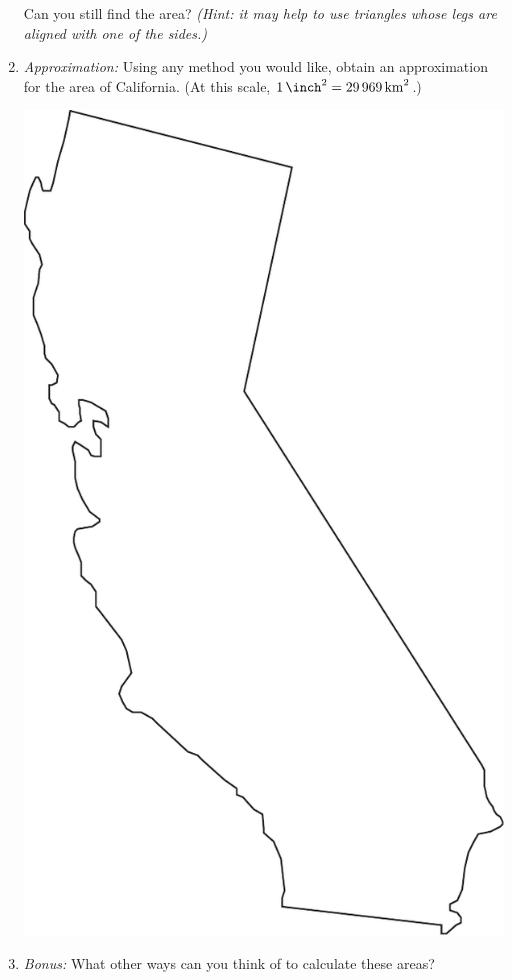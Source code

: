 \documentclass[12pt]{article}
\begin{document}
\begin{enumerate}
  \vspace{0.5in}
  Can you still find the area? \emph{(Hint: it may help to use
    triangles whose legs are aligned with one of the sides.)}
  \clearpage
\item \emph{Approximation:} Using any method you would like, obtain an
  approximation for the area of California. (At this scale,
  $\SI{1}{\square\inch} = \SI{29969}{\square\kilo\meter}$.)
  \vspace{0.5in}
  \begin{center}
    \includegraphics{california.pdf}
  \end{center}
  \vspace{0.5in}
\item \emph{Bonus:} What other ways can you think of to calculate
  these areas?
\end{enumerate}
\end{document}

